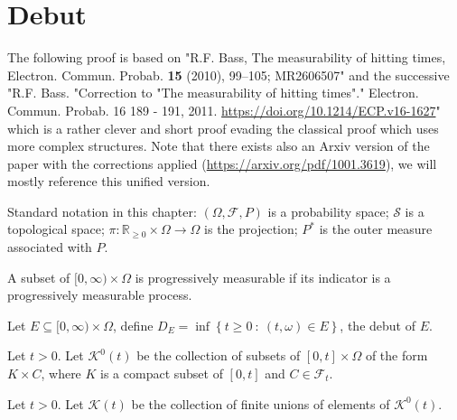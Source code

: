 \section{Debut}
The following proof is based on "R.F. Bass, The measurability of hitting times, Electron. Commun. Probab. {\bf 15} (2010), 99--105; MR2606507"
and the successive "R.F. Bass. "Correction to "The measurability of hitting times"." Electron. Commun. Probab. 16 189 - 191, 2011. \url{https://doi.org/10.1214/ECP.v16-1627}"
which is a rather clever and short proof evading the classical proof which uses more complex structures. Note that there exists also an Arxiv version of the paper with the corrections applied (\url{https://arxiv.org/pdf/1001.3619}), we will mostly reference this unified version.


Standard notation in this chapter:
$(\Omega, \mathcal{F} , P)$ is a probability space;
$\mathcal{S}$ is a topological space;
$\pi:\mathbb{R}_{\geq 0}\times\Omega\rightarrow \Omega$ is the projection; $P^*$ is the outer measure associated with $P$.

\begin{definition}\label{def:progr_meas_set}
  \leanok
A subset of $[0, \infty) \times \Omega$ is progressively measurable if its indicator is a progressively measurable process.
\end{definition}

\begin{definition}\label{def:debut_set}
  \leanok
Let $E \subseteq{} [0, \infty) \times \Omega $, define $D_E = \inf\left\lbrace t \geq 0\ :\ (t, \omega) \in E\right\rbrace$, the debut of $E$.
\end{definition}

\begin{definition}[$\mathcal{K}^0$]\label{def:subsets_compact_RNN_times_measurable}
  \leanok
Let $t>0$. Let $\mathcal{K}^0(t)$ be the collection of subsets of $[0, t] \times \Omega$ of the form $K \times C$, where $K$ is a compact
subset of $[0, t]$ and $C \in \mathcal{F}_t$.
\end{definition}

\begin{definition}[$\mathcal{K}$]\label{def:fin_union_RNN_times_measurable}
  \leanok
Let $t>0$. Let $\mathcal{K}(t)$ be the collection of finite unions of elements of $\mathcal{K}^0(t)$.
\end{definition}


